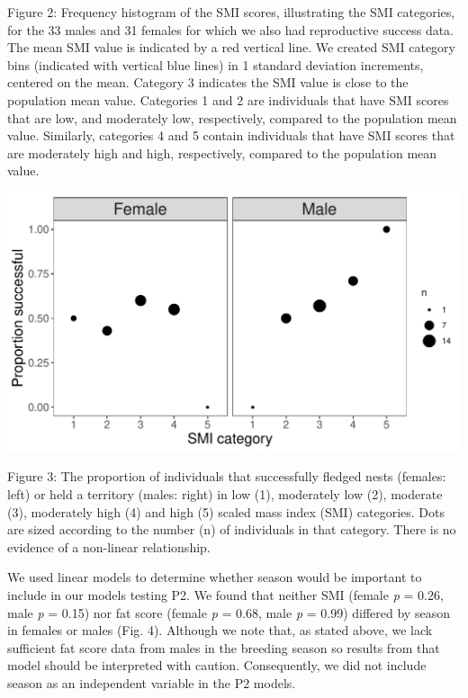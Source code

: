 \documentclass[
]{article}
\begin{document}
Figure 2: Frequency histogram of the SMI scores, illustrating the SMI
categories, for the 33 males and 31 females for which we also had
reproductive success data. The mean SMI value is indicated by a red
vertical line. We created SMI category bins (indicated with vertical
blue lines) in 1 standard deviation increments, centered on the mean.
Category 3 indicates the SMI value is close to the population mean
value. Categories 1 and 2 are individuals that have SMI scores that are
low, and moderately low, respectively, compared to the population mean
value. Similarly, categories 4 and 5 contain individuals that have SMI
scores that are moderately high and high, respectively, compared to the
population mean value.

\includegraphics{gcondition_files/figure-latex/p2 non-linear trend results-1.pdf}

Figure 3: The proportion of individuals that successfully fledged nests
(females: left) or held a territory (males: right) in low (1),
moderately low (2), moderate (3), moderately high (4) and high (5)
scaled mass index (SMI) categories. Dots are sized according to the
number (n) of individuals in that category. There is no evidence of a
non-linear relationship.

We used linear models to determine whether season would be important to
include in our models testing P2. We found that neither SMI (female
\emph{p} = 0.26, male \emph{p} = 0.15) nor fat score (female \emph{p} =
0.68, male \emph{p} = 0.99) differed by season in females or males (Fig.
4). Although we note that, as stated above, we lack sufficient fat score
data from males in the breeding season so results from that model should
be interpreted with caution. Consequently, we did not include season as
an independent variable in the P2 models.
\end{document}
